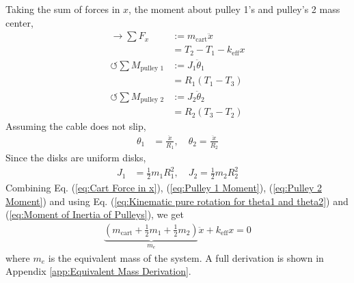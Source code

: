 Taking the sum of forces in $x$, the moment about pulley 1's and pulley's 2 mass center, 
\begin{align}
    \rightarrow \sum F_x &:= m_{\text{cart}} \ddot{x} \nonumber \\
    &=  T_2 - T_1 - k_{\text{eff}}x \label{eq:Cart Force in x} \\
    \circlearrowleft \sum M_{\text{pulley 1}} &:= J_1 \ddot{\theta}_1 \nonumber \\
    &= R_1 (T_1 - T_3) \label{eq:Pulley 1 Moment} \\
    \circlearrowleft \sum M_{\text{pulley 2}} &:= J_2 \ddot{\theta}_2 \nonumber \\
    &= R_2 (T_3 - T_2) \label{eq:Pulley 2 Moment}
\end{align}
Assuming the cable does not slip,
\begin{align}
    \theta_1 &= \frac{\ddot{x}}{R_1}, \quad \theta_2 = \frac{\ddot{x}}{R_2} \label{eq:Kinematic pure rotation for theta1 and theta2}
\end{align}
Since the disks are uniform disks,
\begin{align}
    J_1 &= \frac{1}{2} m_{1} R_1^2, \quad J_2 = \frac{1}{2} m_{2} R_2^2 \label{eq:Moment of Inertia of Pulleys}
\end{align}
Combining Eq. (\ref{eq:Cart Force in x}), (\ref{eq:Pulley 1 Moment}), (\ref{eq:Pulley 2 Moment}) and using Eq. (\ref{eq:Kinematic pure rotation for theta1 and theta2}) and (\ref{eq:Moment of Inertia of Pulleys}), we get
\begin{align}
    \underbrace{\left(m_{\text{cart}} + \frac{1}{2} m_{1} + \frac{1}{2} m_{2}\right)}_{m_e} \ddot{x} + k_{\text{eff}}x = 0 \label{eq:Equivalent Mass Equation of Motion}
\end{align}
where $m_e$ is the equivalent mass of the system. A full derivation is shown in Appendix \ref{app:Equivalent Mass Derivation}.